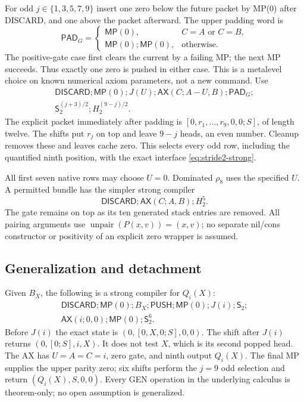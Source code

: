 For odd $j\in\{1,3,5,7,9\}$ insert one zero below the future packet by
MP(0) after DISCARD, and one above the packet afterward. The upper padding
word is
\[
 \mathsf{PAD}_G=
 \begin{cases}
  \mathsf{MP}(0),&C=A\text{ or }C=B,\\
  \mathsf{MP}(0);\mathsf{MP}(0),&\text{otherwise}.
 \end{cases}
\]
The positive-gate case first clears the current by a failing MP; the next
MP succeeds. Thus exactly one zero is pushed in either case. This is a
metalevel choice on known numerical axiom parameters, not a new command.
Use
\begin{equation}
 \begin{split}
 \mathsf{DISCARD};\mathsf{MP}(0);J(U);
 \mathsf{AX}(C;A-U,B);\mathsf{PAD}_G;\\
 \mathsf S_2^{(j+3)/2};H_2^{(9-j)/2}.
 \end{split}
 \label{eq:stride2-odd}
\end{equation}
The explicit packet immediately after padding is
$[0,r_1,\ldots,r_9,0,0;S]$, of length twelve. The shifts put $r_j$ on
top and leave $9-j$ heads, an even number. Cleanup removes these and
leaves cache zero. This selects every odd row, including the quantified
ninth position, with the exact interface \eqref{eq:stride2-strong}.

All first seven native rows may choose $U=0$. Dominated $\rho_8$ uses
the specified $U$. A permitted bundle has the simpler strong compiler
\[
 \mathsf{DISCARD};\mathsf{AX}(C;A,B);H_2^5.
\]
The gate remains on top as its ten generated stack entries are removed.
All pairing arguments use $\operatorname{unpair}(P(x,v))=(x,v)$; no
separate nil/cons constructor or positivity of an explicit zero wrapper
is assumed.

\subsection{Generalization and detachment}

Given $B_X$, the following is a strong compiler for $Q_i(X)$:
\begin{equation}
 \begin{split}
 \mathsf{DISCARD};\mathsf{MP}(0);B_X;
 \mathsf{PUSH};\mathsf{MP}(0);J(i);\mathsf S_2;\\
 \mathsf{AX}(i;0,0);\mathsf{MP}(0);\mathsf S_2^6.
 \end{split}
 \label{eq:stride2-gen}
\end{equation}
Before $J(i)$ the exact state is $(0,[0,X,0;S],0,0)$. The shift after
$J(i)$ returns $(0,[0;S],i,X)$. It does not test $X$, which is its second
popped head. The AX has $U=A=C=i$, zero gate, and ninth output $Q_i(X)$.
The final MP supplies the upper parity zero; six shifts perform the
$j=9$ odd selection and return $(Q_i(X),S,0,0)$. Every GEN operation in
the underlying calculus is theorem-only; no open assumption is
generalized.

